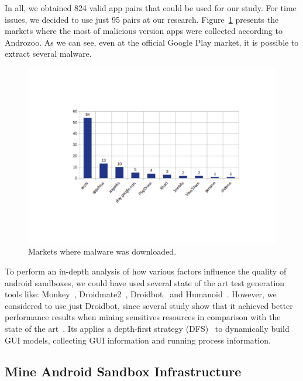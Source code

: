 In all, we obtained 824 valid app pairs that could be used for our study. For time issues, we decided to use just 95 pairs at our research. Figure~\ref{fig:stores} presents the markets where the most of malicious version apps were collected according to Androzoo. As we can see, even at the official Google Play market, it is possible to extract several malware.


\begin{figure}[ht]
\centering
\includegraphics[scale=0.3]{images/stores.pdf}
\caption{Markets where malware was downloaded.}
 \label{fig:stores}
\end{figure}

To perform an in-depth analysis of how various factors influence the quality of android sandboxes, we could have used several state of the art test generation tools like: Monkey~\cite{Monkey}, Droidmate2~\cite{DBLP:conf/kbse/BorgesHZ18}, Droidbot~\cite{DBLP:conf/icse/LiYGC17} and Humanoid~\cite{DBLP:conf/kbse/LiY0C19}. However, we considered to use just Droidbot, since several study show that it achieved better performance results when mining sensitives resources in comparison with the state of the art~\cite{DBLP:conf/wcre/BaoLL18,DBLP:journals/jss/CostaMMSSBNR22}. Its applies a depth-first strategy (DFS)~\cite{DBLP:conf/oopsla/AzimN13} to dynamically build GUI models, collecting GUI information and running process
information.

\subsection{Mine Android Sandbox Infrastructure}\label{sec:infra}

